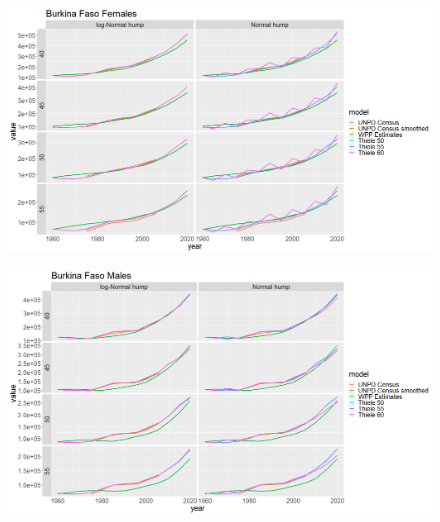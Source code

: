 \documentclass[12pt,a4paper]{article}
\begin{document}
\newpage
\begin{figure}[H]
\includegraphics[width = \linewidth]{age pop females.png}
\end{figure}
\begin{figure}[H]
\includegraphics[width = \linewidth]{age pop males.png}
\end{figure}
\end{document}
